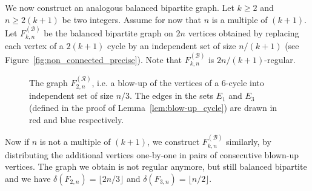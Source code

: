 \documentclass[11pt,a4paper]{article}
\theoremstyle{definition}
\begin{document}
We now construct an analogous balanced bipartite graph. Let $k \ge 2$ and $n\ge 2(k+1)$ be two integers. Assume for now that $n$ is a
multiple of $(k+1)$. Let $F_{k,n}^{(\mathcal B)}$ be the balanced bipartite graph
on $2n$ vertices obtained by replacing each vertex of a $2(k+1)$ cycle by an
independent set of size $n/(k+1)$ (see Figure~\ref{fig:non_connected_precise}). Note
that $F_{k,n}^{(\mathcal B)}$ is $2n/(k+1)$-regular.
\begin{figure}[ht!]
  \centering        
  \caption{The graph $F_{2,n}^{(\mathcal R)}$, i.e. a blow-up of the vertices of a
    6-cycle into independent set of size $n/3$. The edges in the sets $E_1$ and $E_3$ (defined in the proof of Lemma~\ref{lem:blow-up_cycle}) are drawn in red and blue respectively.}\label{fig:bipartite_2n3}
\end{figure}

Now if $n$ is not a multiple of $(k+1)$, we construct $F_{k,n}^{(\mathcal B)}$
similarly, by distributing the additional vertices one-by-one in pairs of consecutive blown-up
vertices. The graph we obtain is not regular anymore, but still balanced
bipartite and we have $\delta(F_{2,n}) = \lfloor 2n/3 \rfloor$ and
$\delta(F_{3,n})= \lfloor n/2 \rfloor$.
\end{document}
